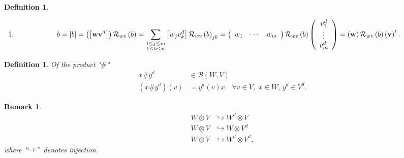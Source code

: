 \documentclass[aps,preprint]{revtex4}%
\newtheorem{definition}[theorem]{Definition}
\newtheorem{remark}[theorem]{Remark}
\begin{document}
\begin{definition}
\begin{enumerate}
\item
\begin{equation}
b=\left[  b\right]  =\left(  \left[  \mathbf{wv}^{d}\right]  \right)
\mathcal{R}_{wv}\left(  b\right)  =\sum_{\substack{1\leq j\leq m\\1\leq k\leq
n}}\left[  w_{j}v_{k}^{d}\right]  \mathcal{R}_{wv}\left(  b\right)
_{jk}=\left(
\begin{array}
[c]{ccc}%
w_{1} & \cdots & w_{m}%
\end{array}
\right)  \mathcal{R}_{wv}\left(  b\right)  \left(
\begin{array}
[c]{c}%
v_{1}^{d}\\
\vdots\\
v_{m}^{d}%
\end{array}
\right)  =\left(  \mathbf{w}\right)  \mathcal{R}_{wv}\left(  b\right)  \left(
\mathbf{v}\right)  ^{t}.
\end{equation}

\end{enumerate}
\end{definition}

\begin{definition}
Of the product "$\#$"
\begin{align}
x\#y^{d}  &  \in\mathcal{B}\left(  W,V\right) \\
\left(  x\#y^{d}\right)  \left(  v\right)   &  =y^{d}\left(  v\right)
x\quad\forall v\in V,\,\,x\in W,\,y^{d}\in V^{d}.
\end{align}

\end{definition}

\begin{remark}%
\begin{align}
W\otimes V  &  \hookrightarrow W^{d}\otimes V\\
W\otimes V  &  \hookrightarrow W\otimes V^{d}\\
W\otimes V  &  \hookrightarrow W^{d}\otimes V^{d},
\end{align}
where "$\hookrightarrow"$ denotes injection.
\end{remark}
\end{document}
